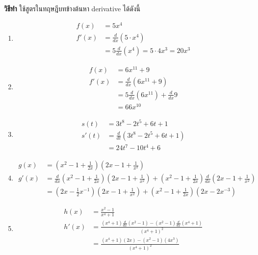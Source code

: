 \documentclass[
]{book}
\theoremstyle{definition}
\theoremstyle{definition}
\theoremstyle{definition}
\theoremstyle{definition}
\theoremstyle{remark}
\begin{document}
\textbf{วิธีทำ} ใช้สูตรในทฤษฎีบทข้างต้นหา derivative ได้ดังนี้

\begin{enumerate}
\def\labelenumi{(\arabic{enumi})}
\item
  \begin{equation}   \begin{aligned}
              f(x) &= 5x^4 \\
              f'(x) &= \frac{d}{dx}(5 \cdot x^4) \\
                  &= 5 \frac{d}{dx}( x^4) = 5 \cdot 4x^3 = 20x^3
    \end{aligned} \end{equation}
\item
  \begin{equation}   \begin{aligned}
              f(x) &= 6x^{11} + 9 \\
              f'(x) &= \frac{d}{dx}(6x^{11} + 9) \\
                  &= 5 \frac{d}{dx}(6x^{11}) + \frac{d}{dx}9\\
                  &= 66x^{10}
    \end{aligned} \end{equation}
\item
  \begin{equation}   \begin{aligned}
              s(t) &= 3t^8 - 2t^5 + 6t + 1 \\
              s'(t) &= \frac{d}{dt}(3t^8 - 2t^5 + 6t + 1) \\
                  &= 24t^7 - 10t^4 + 6
    \end{aligned} \end{equation}
\item
  \begin{equation}   \begin{aligned}
              g(x) &= \left( x^2 - 1 + \frac{1}{2x} \right) \left(2x - 1 + \frac{1}{x^2} \right) \\
              g'(x) &= \frac{d}{dx}\left( x^2 - 1 + \frac{1}{2x} \right)\left(2x - 1 + \frac{1}{x^2} \right)
              +  \left( x^2 - 1 + \frac{1}{2x} \right) \frac{d}{dx} \left(2x - 1 + \frac{1}{x^2} \right)\\
                  &= \left(2x - \frac{1}{2}x^{-1} \right)\left(2x - 1 + \frac{1}{x^2} \right)
              +  \left( x^2 - 1 + \frac{1}{2x} \right) \left(2x -2x^{-3} \right)
    \end{aligned} \end{equation}
\item
  \begin{equation}   \begin{aligned}
   h(x) &= \frac{x^2 -1}{x^4 + 1} \\
          h'(x) &= \frac{(x^4 + 1) \frac{d}{dx}(x^2 -1) - (x^2 -1)\frac{d}{dx}(x^4 + 1)   }{(x^4 + 1)^2}\\
          &= \frac{(x^4 + 1) (2x) - (x^2 -1)(4x^3)   }{(x^4 + 1)^2}
    \end{aligned} \end{equation}
\end{enumerate}
\end{document}
